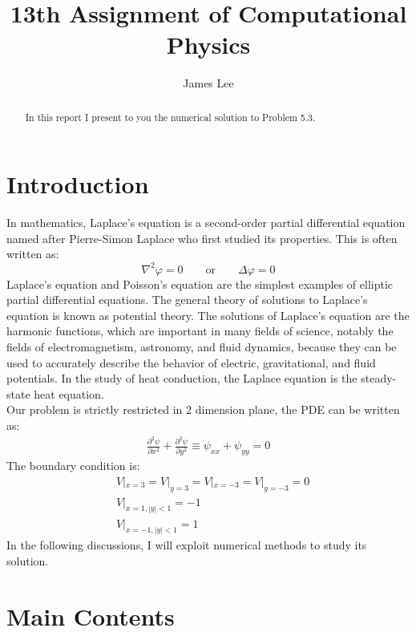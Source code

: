 \documentclass[10pt,a4paper]{article}
\author{James Lee}
\title{13th Assignment of Computational Physics}
\begin{document}
	\maketitle
	\begin{abstract}
		In this report I present to you the numerical solution to Problem 5.3.
	\end{abstract}
	\section{Introduction}
	In mathematics, Laplace's equation is a second-order partial differential equation named after Pierre-Simon Laplace who first studied its properties. This is often written as:
	\begin{equation}
	 \nabla^2 \varphi = 0  \qquad\mbox{or}\qquad \Delta\varphi = 0
	\end{equation}
	Laplace's equation and Poisson's equation are the simplest examples of elliptic partial differential equations. The general theory of solutions to Laplace's equation is known as potential theory. The solutions of Laplace's equation are the harmonic functions, which are important in many fields of science, notably the fields of electromagnetism, astronomy, and fluid dynamics, because they can be used to accurately describe the behavior of electric, gravitational, and fluid potentials. In the study of heat conduction, the Laplace equation is the steady-state heat equation.\\
	Our problem is strictly restricted in 2 dimension plane, the PDE can be written as:
	\begin{align}
	\frac{\partial^2\psi}{\partial x^2} + \frac{\partial^2\psi}{\partial y^2} \equiv \psi_{xx} + \psi_{yy} = 0
	\end{align}
	The boundary condition is:
	\begin{align}
	& V|_{x=3}=V|_{y=3}=V|_{x=-3}=V|_{y=-3}=0\\
	& V|_{x=1,|y|<1}=-1\\
	& V|_{x=-1,|y|<1}=1
	\end{align}
	In the following discussions, I will exploit numerical methods to study its solution.
	
	\section{Main Contents}
\end{document}
